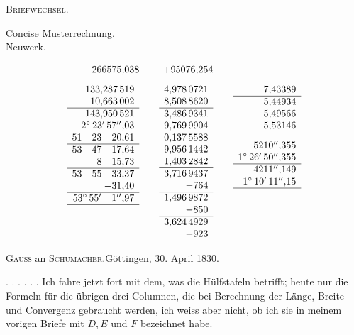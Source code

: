 \par\clearpage
{}\hfill\textsc{Briefwechsel.}\hfill\mbox{}\par\medskip
\begin{center}Concise Musterrechnung.\\Neuwerk.\end{center}
\[
\begin{array}{r@{\qquad}r@{\qquad}r}
-266575{,}038&+95076{,}254&\\[8pt]
\begin{array}[t]{r}
133{,}287\,519\\10{,}663\,002\\\hline
143{,}950\,521\\2^\circ\,23'\,57''{,}03\\51\quad23\quad20{,}61\\\hline
53\quad47\quad17{,}64\\8\quad15{,}73\\\hline
53\quad55\quad33{,}37\\-31{,}40\\\hline
53^\circ\,55'\quad1''{,}97\\\hline
\end{array}&
\begin{array}[t]{r}
4{,}978\,0721\\8{,}508\,8620\\\hline
3{,}486\,9341\\9{,}769\,9904\\0{,}137\,5588\\9{,}956\,1442\\1{,}403\,2842\\\hline
3{,}716\,9437\\-764\\\hline
1{,}496\,9872\\-850\\\hline
3{,}624\,4929\\-923
\end{array}&
\begin{array}[t]{r}
7{,}43389\\\hline5{,}44934\\5{,}49566\\5{,}53146\\[8pt]
5210''{,}355\\1^\circ\,26'\,50''{,}355\\\hline
4211''{,}149\\1^\circ\,10'\,11''{,}15\\\hline
\end{array}
\end{array}
\]
\bigskip
\begin{center}\textsc{Gauss} an \textsc{Schumacher}.\quad Göttingen, 30. April 1830.\end{center}
. . . . . . Ich fahre jetzt fort mit dem, was die Hülfstafeln betrifft; heute nur die Formeln für die übrigen drei Columnen, die bei Berechnung der Länge, Breite und Convergenz gebraucht werden, ich weiss aber nicht, ob ich sie in meinem vorigen Briefe mit \(D,E\) und \(F\) bezeichnet habe.

